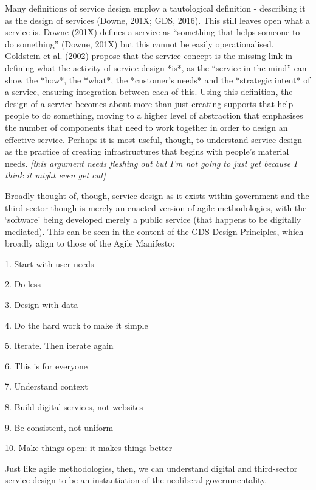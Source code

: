 Many definitions of service design employ a tautological definition -
describing it as the design of services (Downe, 201X; GDS, 2016). This
still leaves open what a service is. Downe (201X) defines a service as
``something that helps someone to do something'' (Downe, 201X) but this
cannot be easily operationalised. Goldstein et al. (2002) propose that
the service concept is the missing link in defining what the activity of
service design *is*, as the ``service in the mind'' can show the *how*,
the *what*, the *customer's needs* and the *strategic intent* of a
service, ensuring integration between each of this. Using this
definition, the design of a service becomes about more than just
creating supports that help people to do something, moving to a higher
level of abstraction that emphasises the number of components that need
to work together in order to design an effective service. Perhaps it is
most useful, though, to understand service design as the practice of
creating infrastructures that begins with people's material needs.
\emph{\emph{{[}this argument needs fleshing out but I'm not going to
just yet because I think it might even get cut{]}}}

Broadly thought of, though, service design as it exists within
government and the third sector though is merely an enacted version of
agile methodologies, with the `software' being developed merely a public
service (that happens to be digitally mediated). This can be seen in the
content of the GDS Design Principles, which broadly align to those of
the Agile Manifesto:

1. Start with user needs

2. Do less

3. Design with data

4. Do the hard work to make it simple

5. Iterate. Then iterate again

6. This is for everyone

7. Understand context

8. Build digital services, not websites

9. Be consistent, not uniform

10. Make things open: it makes things better

Just like agile methodologies, then, we can understand digital and
third-sector service design to be an instantiation of the neoliberal
governmentality.

